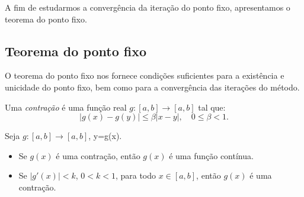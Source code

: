 A fim de estudarmos a convergência da iteração do ponto fixo, apresentamos o teorema do ponto fixo.

\subsection{Teorema do ponto fixo}

O teorema do ponto fixo nos fornece condições suficientes para a existência e unicidade do ponto fixo, bem como para a convergência das iterações do método.

\begin{defn}
 Uma \emph{contração} é uma função real $g:[a, b]\to [a, b]$ tal que:
 \begin{equation}
   |g(x)-g(y)|\leq \beta |x-y|,\quad 0\leq \beta < 1.
 \end{equation}
\end{defn}

\begin{obs}Seja $g:[a, b]\to [a, b]$, y=g(x).
  \begin{itemize}
  \item Se $g(x)$ é uma contração, então $g(x)$ é uma função contínua.
  \item Se $|g'(x)| < k$, $0 < k < 1$, para todo $x\in [a, b]$, então $g(x)$ é uma contração.
  \end{itemize}
\end{obs}

